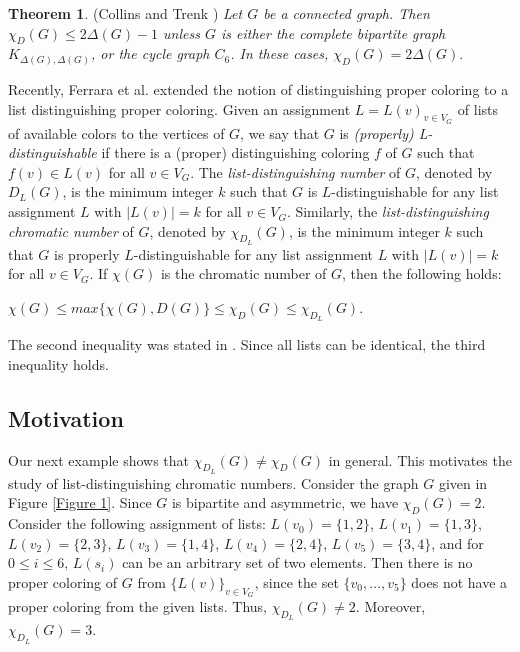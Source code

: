 \documentclass[12pt,reqno,a4paper]{amsart}
\theoremstyle{definition}
\newtheorem{thm}[defn]{Theorem}
\begin{document}
\begin{thm}\label{Theorem 1.1}{(Collins and Trenk \cite[Theorem 4.5]{CT2006})}
{\em Let $G$ be a connected graph. Then $\chi_{D}(G)\leq 2\Delta(G)-1$ unless $G$ is either the complete bipartite graph $K_{\Delta(G),\Delta(G)}$, or the cycle graph $C_{6}$. In these cases, $\chi_{D}(G) = 2\Delta(G)$}.    
\end{thm}

Recently, Ferrara et al. \cite{FGHSW2013} extended the notion of distinguishing proper coloring to a list distinguishing proper coloring. Given an assignment $L = {L(v)}_{v\in V_{G}}$ of lists of available colors to the vertices of $G$, we say that $G$ is {\em (properly) L-distinguishable} if there is a (proper) distinguishing coloring $f$ of $G$ such that $f(v) \in L(v)$ for all $v\in V_{G}$. The {\em list-distinguishing number}
of $G$, denoted by $D_{L}(G)$, is the minimum integer $k$ such that $G$ is $L$-distinguishable for any list assignment $L$ with $\vert L(v)\vert = k$ for all $v\in V_{G}$. Similarly, the {\em list-distinguishing chromatic number} of $G$, denoted by $\chi_{D_{L}}(G)$, is the minimum integer $k$ such that $G$ is properly $L$-distinguishable for any list
assignment $L$ with $\vert L(v)\vert = k$ for all $v\in V_{G}$. If $\chi(G)$ is the chromatic number of $G$, then the following holds:

\begin{center}
$\chi(G)\leq max\{\chi(G), D(G)\} \leq \chi_{D}(G) \leq \chi_{D_{L}}(G)$.
\end{center}

The second inequality was stated in \cite{CT2006}. Since all lists can be identical, the third inequality holds.

\subsection{Motivation}
Our next example shows that $\chi_{D_L}(G)\neq \chi_D(G)$ in general. This motivates the study of list-distinguishing chromatic numbers.
Consider the graph $G$ given in Figure \ref{Figure 1}. Since $G$ is bipartite and asymmetric, we have $\chi_D(G) = 2$. Consider the following assignment of lists: $L(v_0) =\{1,2\}$, $L(v_1) = \{1,3\}$, $L(v_2) = \{2,3\}$, $L(v_3) = \{1,4\}$, $L(v_4) = \{2,4\}$, $L(v_5) =\{3,4\}$, and for $0\leq i \leq 6$, $L(s_i)$ can be an arbitrary set of two elements. Then there is no proper coloring of $G$ from $\{L(v)\}_{v\in V_G}$, since the set $\{v_0,\dots, v_5\}$ does not have a proper coloring from the given lists. Thus, $\chi_{D_L}(G) \neq 2$. Moreover, $\chi_{D_L}(G) = 3$.
\end{document}
